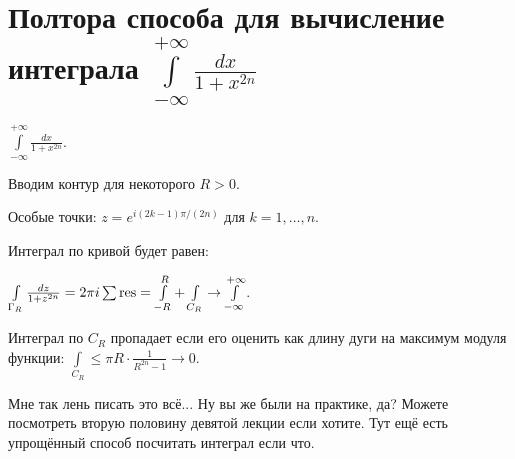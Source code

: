 \section{Полтора способа для вычисление интеграла $\int\limits_{-\infty}^{+\infty} \frac{dx}{1+x^{2n}}$}

\begin{example}
    $\int\limits_{-\infty}^{+\infty} \frac{dx}{1+x^{2n}}$.

    Вводим контур для некоторого $R > 0$.


    Особые точки: $z = e^{i(2k-1)\pi / (2n)}$ для $k = 1, \ldots, n$.

    Интеграл по кривой будет равен:

    $\int\limits_{\Gamma_R} \frac{dz}{1+z^{2n}} = 2\pi i \sum \operatorname*{res}
        = \int\limits_{-R}^R + \int\limits_{C_R} \to \int\limits_{-\infty}^{+\infty}$.

    Интеграл по $C_R$ пропадает если его оценить
    как длину дуги на максимум модуля функции:
    $\int\limits_{C_R} \le \pi R \cdot \frac{1}{R^{2n}-1} \to 0$.

    Мне так лень писать это всё... Ну вы же были на практике, да?
    Можете посмотреть вторую половину девятой лекции если хотите.
    Тут ещё есть упрощённый способ посчитать интеграл если что.
\end{example}

\newpage


